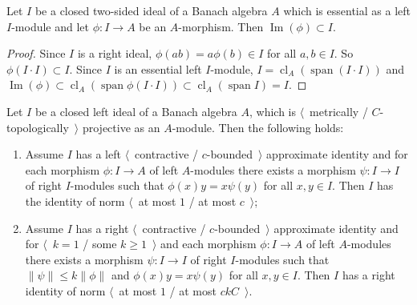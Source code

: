 \begin{lemma}\label{ImgOfAMorphFromBiIdToA} Let $I$ be a closed two-sided ideal of a
Banach algebra $A$ which is essential as a left $I$-module and let $\phi:I\to A$
be an $A$-morphism. Then $\operatorname{Im}(\phi)\subset I$.
\end{lemma}
\begin{proof} Since $I$ is a right ideal, $\phi(ab)=a\phi(b)\in I$ for all
$a,b\in I$. So $\phi(I\cdot I)\subset I$. Since $I$ is an essential left
$I$-module, $I=\operatorname{cl}_A(\operatorname{span}(I\cdot I))$ and
$\operatorname{Im}(\phi)
\subset\operatorname{cl}_A(\operatorname{span}\phi(I\cdot I))
\subset\operatorname{cl}_A(\operatorname{span}I)
=I$.
\end{proof}

\begin{lemma}\label{GoodIdealMetTopProjIsUnital} Let $I$ be a closed left ideal of a
Banach algebra $A$, which is $\langle$~metrically / $C$-topologically~$\rangle$
projective as an $A$-module. Then the following holds:

\begin{enumerate}[label = (\roman*)]
    \item Assume $I$ has a left $\langle$~contractive / $c$-bounded~$\rangle$
    approximate identity and for each  morphism $\phi:I\to A$ of left
    $A$-modules there exists a morphism $\psi:I\to I$ of right $I$-modules such
    that $\phi(x)y=x\psi(y)$ for all $x,y\in I$. Then $I$ has the identity of
    norm $\langle$~at most $1$ / at most $c$~$\rangle$;

    \item Assume $I$ has a right $\langle$~contractive / $c$-bounded~$\rangle$
    approximate identity and for $\langle$~$k=1$ / some $k\geq 1$~$\rangle$ and
    each morphism $\phi:I\to A$ of left $A$-modules there exists a morphism
    $\psi:I\to I$ of right $I$-modules such that $\lVert\psi\rVert\leq
    k\lVert\phi\rVert$ and $\phi(x)y=x\psi(y)$ for all $x,y\in I$. Then $I$ has a
    right identity of norm $\langle$~at most $1$ / at most $ckC$~$\rangle$.
\end{enumerate}
\end{lemma} 
